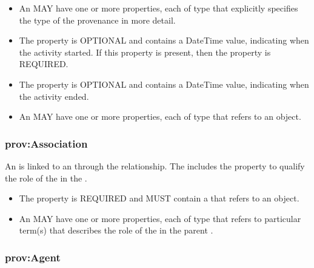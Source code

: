 \begin{itemize}
\item \label{sec:type:Activity}
An  MAY have one or more  properties, each of type  that explicitly specifies the type of the provenance  in more detail.

\item \label{sec:prov:startedAtTime}
The  property is OPTIONAL and contains a DateTime value, indicating when the activity started.  If this property is present, then the  property is REQUIRED.

\item \label{sec:prov:endedAtTime}
The  property is OPTIONAL and contains a DateTime value, indicating when the activity ended.

\item \label{sec:prov:qualifiedAssociation}
An  MAY have one or more  properties, each of type  that refers to an  object.
\end{itemize}

\subsubsection{prov:Association}
\label{sec:prov:Association}

An  is linked to an  through the  relationship. The  includes the  property to qualify the role of the  in the .

\begin{itemize}
\item \label{sec:prov:agent}
The  property is REQUIRED and MUST contain a  that refers to an  object.

\item \label{sec:prov:hadRole:A}
An  MAY have one or more  properties, each of type  that refers to particular term(s) that describes the role of the  in the parent . 
\end{itemize}

\subsubsection{prov:Agent}
\label{sec:prov:Agent}

